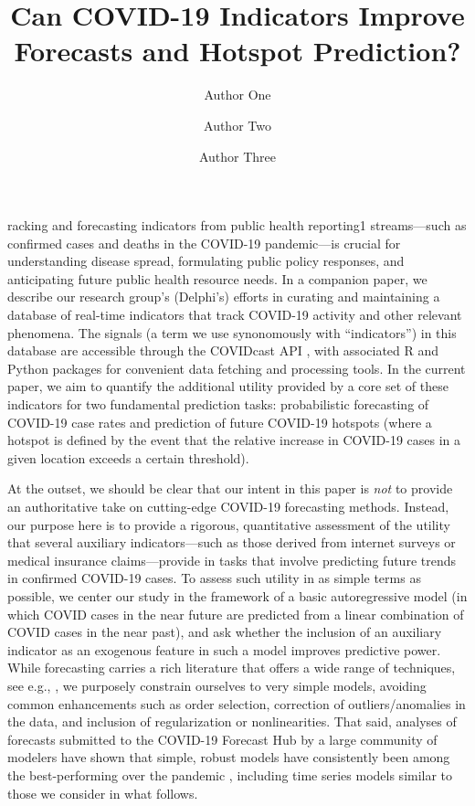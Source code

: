 \documentclass[9pt,twocolumn,twoside,lineno]{pnas-new}
\title{Can COVID-19 Indicators Improve Forecasts and Hotspot Prediction?}
\author[a,c,1]{Author One}
\author[b,1,2]{Author Two}
\author[a]{Author Three}
\affil[a]{Affiliation One}
\affil[b]{Affiliation Two}
\affil[c]{Affiliation Three}
\begin{document}
\maketitle
\thispagestyle{firststyle}

racking and forecasting indicators from public health reporting1
streams---such as confirmed cases and deaths in the COVID-19 pandemic---is
crucial for understanding disease spread, formulating public policy responses,
and anticipating future public health resource needs.  In a companion paper, we
describe our research group's (Delphi's) efforts in curating and maintaining a 
database of real-time indicators that track COVID-19 activity and other relevant
phenomena. The signals (a term we use synonomously with ``indicators'') in this
database are accessible through the COVIDcast API \cite{CovidcastAPI}, with
associated R \cite{CovidcastR} and Python \cite{CovidcastPy} packages for
convenient data fetching and processing tools. In the current paper, we aim to
quantify the additional utility provided by a core set of these indicators for
two fundamental prediction tasks: probabilistic forecasting of COVID-19 case
rates and prediction of future COVID-19 hotspots (where a hotspot is defined by
the event that the relative increase in COVID-19 cases in a given location
exceeds a certain threshold).

At the outset, we should be clear that our intent in this paper is \emph{not} to
provide an authoritative take on cutting-edge COVID-19 forecasting methods.
Instead, our purpose here is to provide a rigorous, quantitative assessment of
the utility that several auxiliary indicators---such as those derived from
internet surveys or medical insurance claims---provide in tasks that involve
predicting future trends in confirmed COVID-19 cases. To assess such utility in
as simple terms as possible, we center our study in the framework of a basic
autoregressive model (in which COVID cases in the near future are predicted from  
a linear combination of COVID cases in the near past), and ask whether the 
inclusion of an auxiliary indicator as an exogenous feature in such a model
improves predictive power. While forecasting carries a rich literature that
offers a wide range of techniques, see e.g., \cite{Hyndman:2018}, we purposely
constrain ourselves to very simple models, avoiding common enhancements such as
order selection, correction of outliers/anomalies in the data, and inclusion of
regularization or nonlinearities. That said, analyses of forecasts submitted to
the COVID-19 Forecast Hub \cite{ForecastHub} by a large community of modelers
have shown that simple, robust models have consistently been among the
best-performing over the pandemic \cite{Cramer:2021}, including time series
models similar to those we consider in what follows.
\end{document}
